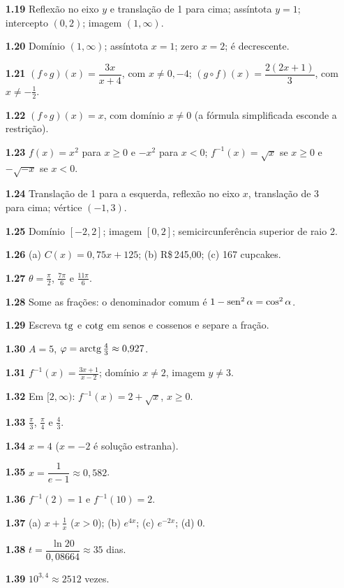 {\begin{multicols}{2}
\begin{itemize}[leftmargin=2.7em,labelsep=0.5em,itemsep=1pt]
\item[\textbf{1.19}] Reflexão no eixo $y$ e translação de 1 para cima; assíntota $y=1$; intercepto $(0,2)$; imagem $(1,\infty)$.
\item[\textbf{1.20}] Domínio $(1,\infty)$; assíntota $x=1$; zero $x=2$; é decrescente.
\item[\textbf{1.21}] $(f\circ g)(x)=\dfrac{3x}{x+4}$, com $x\neq0,-4$;\quad
$(g\circ f)(x)=\dfrac{2(2x+1)}{3}$, com $x\neq-\tfrac12$.
\item[\textbf{1.22}] $(f\circ g)(x)=x$, com domínio $x\neq0$ (a fórmula simplificada esconde a restrição).
\item[\textbf{1.23}] $f(x)=x^2$ para $x\ge0$ e $-x^2$ para $x<0$; $f^{-1}(x)=\sqrt x$ se $x\ge0$ e $-\sqrt{-x}$ se $x<0$.
\item[\textbf{1.24}] Translação de 1 para a esquerda, reflexão no eixo $x$, translação de 3 para cima; vértice $(-1,3)$.
\item[\textbf{1.25}] Domínio $[-2,2]$; imagem $[0,2]$; semicircunferência superior de raio 2.
\item[\textbf{1.26}] (a) $C(x)=0{,}75x+125$; (b) R\$\,245,00; (c) 167 cupcakes.
\item[\textbf{1.27}] $\theta=\tfrac\pi2$, $\tfrac{7\pi}6$ e $\tfrac{11\pi}6$.
\item[\textbf{1.28}] Some as frações: o denominador comum é $1-\operatorname{sen}^2\alpha=\cos^2\alpha$.
\item[\textbf{1.29}] Escreva $\operatorname{tg}$ e $\operatorname{cotg}$ em senos e cossenos e separe a fração.
\item[\textbf{1.30}] $A=5$, $\varphi=\operatorname{arctg}\tfrac43\approx0{,}927$.
\item[\textbf{1.31}] $f^{-1}(x)=\tfrac{3x+1}{x-2}$; domínio $x\neq2$, imagem $y\neq3$.
\item[\textbf{1.32}] Em $[2,\infty)$: $f^{-1}(x)=2+\sqrt x$, $x\ge0$.
\item[\textbf{1.33}] $\tfrac\pi3$, $\tfrac\pi4$ e $\tfrac43$.
\item[\textbf{1.34}] $x=4$ ($x=-2$ é solução estranha).
\item[\textbf{1.35}] $x=\dfrac1{e-1}\approx0{,}582$.
\item[\textbf{1.36}] $f^{-1}(2)=1$ e $f^{-1}(10)=2$.
\item[\textbf{1.37}] (a) $x+\frac1x$ ($x>0$); (b) $e^{4x}$; (c) $e^{-2x}$; (d) $0$.
\item[\textbf{1.38}] $t=\dfrac{\ln 20}{0{,}08664}\approx35$ dias.
\item[\textbf{1.39}] $10^{3{,}4}\approx2512$ vezes.

\end{itemize}
\end{multicols}}
